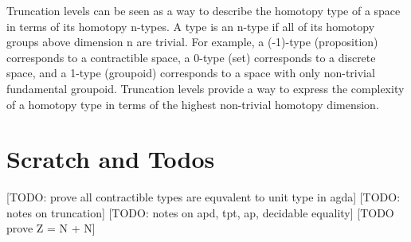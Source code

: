 \documentclass{article}
\begin{document}
\begin{remark}[Relationship]
  Truncation levels can be seen as a way to describe the homotopy type of a space in terms of its homotopy n-types. A type is an n-type if all of its homotopy groups above dimension n are trivial. For example, a (-1)-type (proposition) corresponds to a contractible space, a 0-type (set) corresponds to a discrete space, and a 1-type (groupoid) corresponds to a space with only non-trivial fundamental groupoid. Truncation levels provide a way to express the complexity of a homotopy type in terms of the highest non-trivial homotopy dimension.
\end{remark}

\section{Scratch and Todos}

[TODO: prove all contractible types are equvalent to unit type in agda]
[TODO: notes on truncation]
[TODO: notes on apd, tpt, ap, decidable equality]
[TODO prove Z = N + N]
\end{document}
